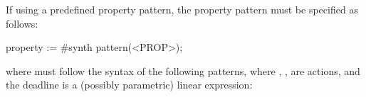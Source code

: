 %
%
%
%
%



If using a predefined property pattern, the property pattern must be specified as follows:

\begin{IMITATORproperty}
property := #synth pattern(<PROP>);
\end{IMITATORproperty}

\noindent{}where  must follow the syntax of the following patterns, where , ,  are actions, and the deadline  is a (possibly parametric) linear expression:

